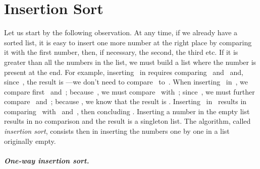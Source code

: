 
\chapter{Insertion Sort}
\label{chap:insertion_sort}

Let us start by the following observation. At any time, if we already
have a sorted list, it is easy to insert one more number at the right
place by comparing it with the first number, then, if necessary, the
second, the third etc. If it is greater than all the numbers in the
list, we must build a list where the number is present at the end. For
example, inserting~ in \erlcode{[3,6]} requires comparing
~and~ and, since~, the result is
\erlcode{[\textbf{1},3,6]}---we don't need to compare~
to~. When inserting~ in~\erlcode{[1,3,6]}, we
compare first ~and~; because~, we
must compare ~with~; since~, we
must further compare ~and~; because
, we know that the result is
\erlcode{[1,3,\textbf{4},6]}. Inserting~ in~\erlcode{[3,6]}
results in comparing ~with~ and~,
then concluding \erlcode{[3,6,\textbf{7}]}. Inserting a number in the
empty list results in no comparison and the result is a singleton
list. The algorithm, called \emph{insertion sort}, consists then in
inserting the numbers one by one in a list originally empty.

\medskip

\paragraph{One\hyp{}way insertion sort.}

